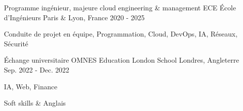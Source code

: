 

\begin{cventries}

    \cventry
    {Programme ingénieur, majeure cloud engineering \& management} %
    {ECE École d'Ingénieurs} %
    {Paris \& Lyon, France} %
    {2020 - 2025} %
    {
        \begin{cvitems} %
            \item {Conduite de projet en équipe, Programmation, Cloud, DevOps, IA, Réseaux, Sécurité}
        \end{cvitems}
    }

    \cventry
    {Échange universitaire} %
    {OMNES Education London School} %
    {Londres, Angleterre} %
    {Sep. 2022 - Dec. 2022} %
    {
        \begin{cvitems} %
            \item {IA, Web, Finance}
            \item {Soft skills \& Anglais}
        \end{cvitems}
    }

\end{cventries}
